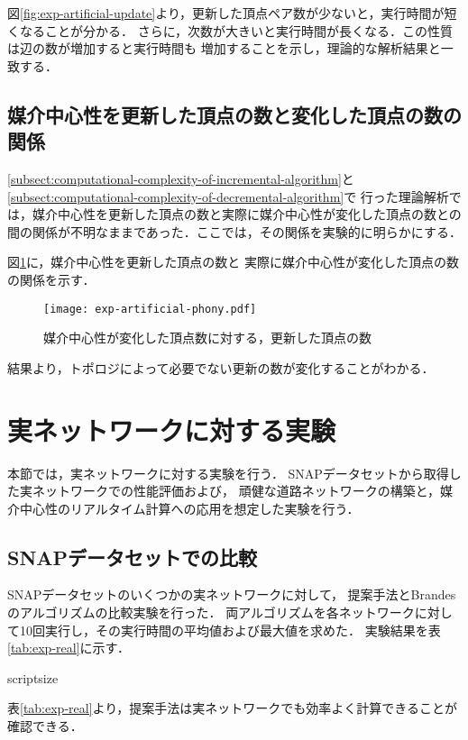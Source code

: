 図\ref{fig:exp-artificial-update}より，更新した頂点ペア数が少ないと，実行時間が短くなることが分かる．
さらに，次数が大きいと実行時間が長くなる．この性質は辺の数が増加すると実行時間も
増加することを示し，理論的な解析結果と一致する．

\subsection{媒介中心性を更新した頂点の数と変化した頂点の数の関係}

\ref{subsect:computational-complexity-of-incremental-algorithm}と
\ref{subsect:computational-complexity-of-decremental-algorithm}で
行った理論解析では，媒介中心性を更新した頂点の数と実際に媒介中心性が変化した頂点の数との
間の関係が不明なままであった．ここでは，その関係を実験的に明らかにする．

図\ref{fig:exp-artificial-phony}に，媒介中心性を更新した頂点の数と
実際に媒介中心性が変化した頂点の数の関係を示す．

\begin{figure}[tb]
  \centering
  \texttt{[image: exp-artificial-phony.pdf]}
  \caption{媒介中心性が変化した頂点数に対する，更新した頂点の数}
  \label{fig:exp-artificial-phony}
\end{figure}

結果より，トポロジによって必要でない更新の数が変化することがわかる．

\section{実ネットワークに対する実験}
\label{sect:exp-realnet}

本節では，実ネットワークに対する実験を行う．
SNAPデータセット\cite{Leskovec2016}から取得した実ネットワークでの性能評価および，
頑健な道路ネットワークの構築と，媒介中心性のリアルタイム計算への応用を想定した実験を行う．

\subsection{SNAPデータセットでの比較}
\label{subsect:exp-real}

SNAPデータセットのいくつかの実ネットワークに対して，
提案手法とBrandesのアルゴリズムの比較実験を行った．
両アルゴリズムを各ネットワークに対して10回実行し，その実行時間の平均値および最大値を求めた．
実験結果を表\ref{tab:exp-real}に示す．

{scriptsize
  
  }

表\ref{tab:exp-real}より，提案手法は実ネットワークでも効率よく計算できることが確認できる．

